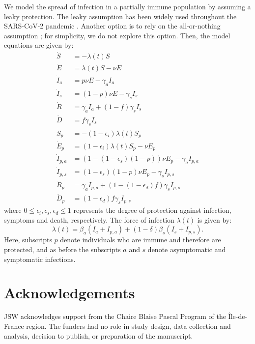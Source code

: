 \documentclass[12pt]{article}
\begin{document}
We model the spread of infection in a partially immune population by assuming a leaky protection.
The leaky assumption has been widely used throughout the SARS-CoV-2 pandemic \citep{saad2020immune}.
Another option is to rely on the all-or-nothing assumption \citep{smith1984assessment,buckner2021dynamic,bubar2021model};
for simplicity, we do not explore this option.
Then, the model equations are given by:
\begin{align}
\dot{S} &= -\lambda (t) S \\
\dot{E} &= \lambda (t) S - \nu E\\
\dot{I}_a &= p \nu E - \gamma_a I_a\\
\dot{I}_s &= (1-p) \nu E -\gamma_s I_s\\
\dot{R} &= \gamma_a I_a + (1-f) \gamma_s I_s \\
\dot{D} &= f \gamma_s I_s\\
\dot{S}_p &= - (1-\epsilon_i) \lambda (t) S_p \\
\dot{E}_p &= (1-\epsilon_i) \lambda (t) S_p - \nu E_p\\
\dot{I}_{p, a} &= (1 - (1-\epsilon_s) (1-p)) \nu E_p - \gamma_a I_{p,a}\\
\dot{I}_{p, s} &= (1-\epsilon_s) (1-p) \nu E_p -\gamma_s I_{p,s}\\
\dot{R}_p &= \gamma_a I_{p,a} + (1-(1-\epsilon_d) f) \gamma_s I_{p,s} \\
\dot{D}_p &= (1-\epsilon_d) f \gamma_s I_{p,s}
\end{align}
where $0\leq \epsilon_i, \epsilon_s, \epsilon_d \leq 1$ represents the degree of protection against infection, symptoms and death, respectively. 
The force of infection $\lambda(t)$ is given by:
\begin{equation}
\lambda(t) = \beta_a (I_a + I_{p,a}) + (1-\delta) \beta_s (I_s + I_{p,s}).
\end{equation}
Here, subscripts $p$ denote individuals who are immune and therefore are protected, and as before the subscripts $a$ and $s$ denote asymptomatic and symptomatic infections.

\section*{Acknowledgements}

JSW acknowledges support from the Chaire Blaise Pascal Program of the Île-de-France region.
The funders had no role in study design, data collection and analysis, decision to publish, or preparation of the manuscript. 
\end{document}
